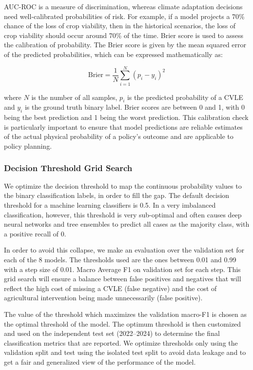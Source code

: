 \documentclass{ieeeaccess}
\begin{document}
AUC-ROC is a measure of discrimination, whereas climate adaptation decisions need well-calibrated probabilities of risk. For example, if a model projects a 70\% chance of the loss of crop viability, then in the historical scenarios, the loss of crop viability should occur around 70\% of the time. Brier score is used to assess the calibration of probability. The Brier score is given by the mean squared error of the predicted probabilities, which can be expressed mathematically as:

\[
\text{Brier}
=
\frac{1}{N}
\sum_{i=1}^{N}
(p_i - y_i)^2
\]

where $N$ is the number of all samples, $p_i$ is the predicted probability of a CVLE and $y_i$ is the ground truth binary label. Brier scores are between 0 and 1, with 0 being the best prediction and 1 being the worst prediction. This calibration check is particularly important to ensure that model predictions are reliable estimates of the actual physical probability of a policy's outcome and are applicable to policy planning.

\subsubsection{Decision Threshold Grid Search}

We optimize the decision threshold to map the continuous probability values to the binary classification labels, in order to fill the gap. The default decision threshold for a machine learning classifiers is 0.5. In a very imbalanced classification, however, this threshold is very sub-optimal and often causes deep neural networks and tree ensembles to predict all cases as the majority class, with a positive recall of 0.

In order to avoid this collapse, we make an evaluation over the validation set for each of the 8 models. The thresholds used are the ones between 0.01 and 0.99 with a step size of 0.01. Macro Average F1 on validation set for each step. This grid search will ensure a balance between false positives and negatives that will reflect the high cost of missing a CVLE (false negative) and the cost of agricultural intervention being made unnecessarily (false positive).

The value of the threshold which maximizes the validation macro-F1 is chosen as the optimal threshold of the model. The optimum threshold is then customized and used on the independent test set (2022--2024) to determine the final classification metrics that are reported. We optimize thresholds only using the validation split and test using the isolated test split to avoid data leakage and to get a fair and generalized view of the performance of the model.
\end{document}
